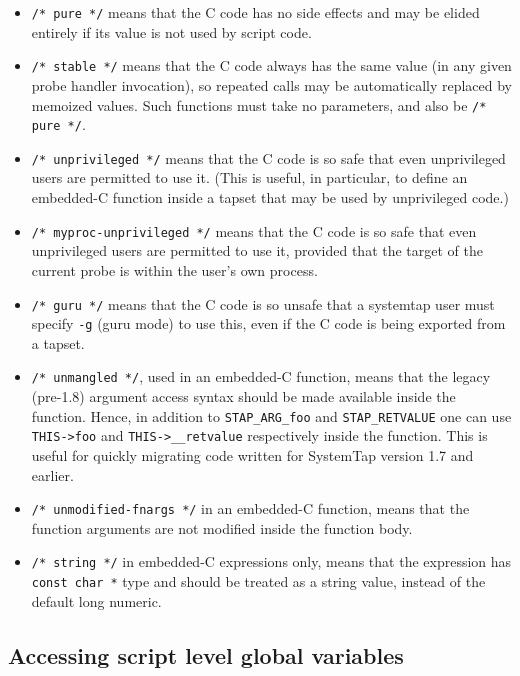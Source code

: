\documentclass[twoside,english]{article}
\begin{document}
\begin{itemize}
\item \verb+/* pure */+ means that the C code has no side effects and
  may be elided entirely if its value is not used by script code.
\item \verb+/* stable */+ means that the C code always has the same value
  (in any given probe handler invocation), so repeated calls may be
  automatically replaced by memoized values. Such functions must take
  no parameters, and also be \verb+/* pure */+.
\item \verb+/* unprivileged */+ means that the C code is so safe that
  even unprivileged users are permitted to use it. (This is useful, in
  particular, to define an embedded-C function inside a tapset that
  may be used by unprivileged code.)
\item \verb+/* myproc-unprivileged */+ means that the C code is so
  safe that even unprivileged users are permitted to use it, provided
  that the target of the current probe is within the user's own
  process.
\item \verb+/* guru */+ means that the C code is so unsafe that a
  systemtap user must specify \verb+-g+ (guru mode) to use this, even
  if the C code is being exported from a tapset.
\item \verb+/* unmangled */+, used in an embedded-C function, means
  that the legacy (pre-1.8) argument access syntax should be made
  available inside the function. Hence, in addition to
  \verb+STAP_ARG_foo+ and \verb+STAP_RETVALUE+ one can use
  \verb+THIS->foo+ and \verb+THIS->__retvalue+ respectively inside the
  function. This is useful for quickly migrating code written for
  SystemTap version 1.7 and earlier.
\item \verb+/* unmodified-fnargs */+ in an embedded-C function, means
  that the function arguments are not modified inside the function body.
\item \verb+/* string */+ in embedded-C expressions only, means that
  the expression has \verb+const char *+ type and should be treated as
  a string value, instead of the default long numeric.
\end{itemize}

\subsection{Accessing script level global variables}
\end{document}
